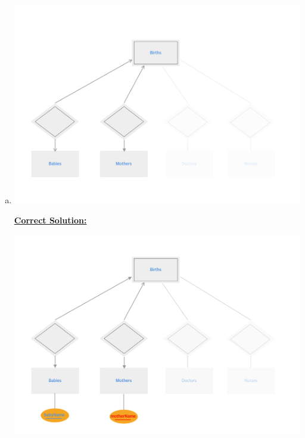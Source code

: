 \documentclass[12pt]{article}
\begin{document}
\begin{enumerate}[1.]
\begin{enumerate}[a)]
        \item

        \begin{center}
        \includegraphics[width=\linewidth]{images/worksheet_14_solution_60.png}
        \end{center}

        \bigskip

        \begin{mdframed}

            \underline{\textbf{Correct Solution:}}

            \bigskip

            \begin{center}
            \includegraphics[width=\linewidth]{images/worksheet_14_solution_65.png}
            \end{center}


\end{mdframed}
\end{enumerate}
\end{enumerate}
\end{document}
